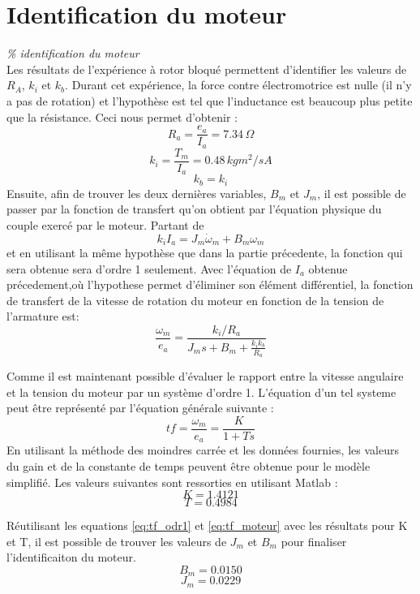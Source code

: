 \documentclass{udes_rapport} %
\begin{document}
\section{Identification du moteur}
\textit{\% identification du moteur} \\
Les résultats de l'expérience à rotor bloqué permettent d'identifier les valeurs de $R_A$, $k_i$ et $k_b$. Durant cet expérience, la force contre électromotrice est nulle (il n'y a pas de rotation) et l'hypothèse est tel que l'inductance est beaucoup plus petite que la résistance. Ceci nous permet d'obtenir :
\[	R_a = \frac{e_a}{I_a} = 7.34\,\Omega	\]
\[	k_i = \frac{T_m}{I_a} =	0.48\,kgm^2/sA 		\]
\[	k_b = k_i							\]
Ensuite, afin de trouver les deux dernières variables, $B_m$ et $J_m$, il est possible de passer par la fonction de transfert qu'on obtient par l'équation physique du couple exercé par le moteur. Partant de 
\begin{equation}
k_i I_a = J_m \dot{\omega} _m + B_m \omega _m
\label{eq:torque}
\end{equation}
et en utilisant la même hypothèse que dans la partie précedente, la fonction qui sera obtenue sera d'ordre 1 seulement. Avec l'équation de $I_a$ obtenue précedement,où l'hypothese permet d'éliminer son élément différentiel, la fonction de transfert de la vitesse de rotation du moteur en fonction de la tension de l'armature est:
\begin{equation}
\frac{\omega_m}{e_a} = \frac{k_i/R_a}{J_m s + B_m + \frac{k_i k_b}{R_a}}
\label{eq:tf_moteur}
\end{equation}

Comme il est maintenant possible d'évaluer le rapport entre la vitesse angulaire et la tension du moteur par un système d'ordre 1. L'équation d'un tel systeme peut être représenté par l'équation générale suivante :
\begin{equation}
tf = \frac{\omega_m}{e_a} = \frac{K}{1+Ts}
\label{eq:tf_odr1}
\end{equation}
En utilisant la méthode des moindres carrée et les données fournies, les valeurs du gain et de la constante de temps peuvent être obtenue pour le modèle simplifié. Les valeurs suivantes sont ressorties en utilisant Matlab :
\[	K = 1.4121	\]
\[	T = 0.4984	\]

Réutilisant les equations \eqref{eq:tf_odr1} et \eqref{eq:tf_moteur} avec les résultats pour K et T, il est possible de trouver les valeurs de $J_m$ et $B_m$ pour finaliser l'identificaiton du moteur.
\[B_m = 0.0150	\]
\[J_m = 0.0229	\]
\end{document}
